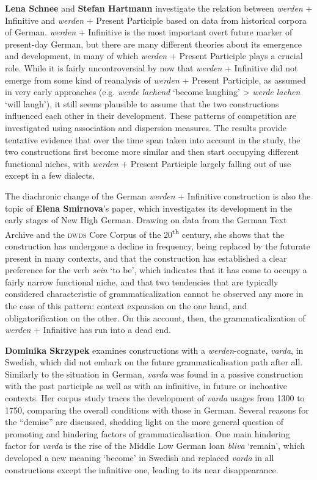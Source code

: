 \documentclass[output=paper,colorlinks,citecolor=brown]{langscibook}
\begin{document}
\textbf{Lena Schnee} and \textbf{Stefan Hartmann} investigate the relation between \textit{werden} + Infinitive and \textit{werden} + Present Participle based on data from historical corpora of German. \textit{werden} + Infinitive is the most important overt future marker of present-day German, but there are many different theories about its emergence and development, in many of which \textit{werden} + Present Participle plays a crucial role. While it is fairly uncontroversial by now that \textit{werden} + Infinitive did not emerge from some kind of reanalysis of \textit{werden} + Present Participle, as assumed in very early approaches (e.g. \textit{werde lachend} `become laughing' > \textit{werde lachen} `will laugh'), it still seems plausible to assume that the two constructions influenced each other in their development. These patterns of competition are investigated using association and dispersion measures. The results provide tentative evidence that over the time span taken into account in the study, the two constructions first become more similar and then start occupying different functional niches, with \textit{werden} + Present Participle largely falling out of use except in a few dialects.

The diachronic change of the German \textit{werden} + Infinitive construction is also the topic of \textbf{Elena Smirnova}'s paper, which investigates its development  in the early stages of New High German. Drawing on data from the German Text Archive and the \textsc{dwds} Core Corpus of the 20\textsuperscript{th} century, she shows that the construction has undergone a decline in frequency, being replaced by the futurate present in many contexts, and that the construction has established a clear preference for the verb \textit{sein} `to be', which indicates that it has come to occupy a fairly narrow functional niche, and that two tendencies that are typically considered characteristic of grammaticalization cannot be observed any more in the case of this pattern: context expansion \citep[][]{Himmelmann2004} on the one hand, and obligatorification \citep[][]{Lehmann2015} on the other. On this account, then, the grammaticalization of \textit{werden} + Infinitive has run into a dead end.

\textbf{Dominika Skrzypek} examines constructions with a \textit{werden}-cognate, \textit{varda}, in Swedish, which did not embark on the future grammaticalisation path after all. Similarly to the situation in German, \textit{varda} was found in a passive construction with the past participle as well as with an infinitive, in future or inchoative contexts. Her corpus study traces the development of \textit{varda} usages from 1300 to 1750, comparing the overall conditions with those in German. Several reasons for the “demise” are discussed, shedding light on the more general question of promoting and hindering factors of grammaticalisation. One main hindering factor for \textit{varda} is the rise of the Middle Low German loan \textit{bliva} ‘remain’, which developed a new meaning ‘become' in Swedish and replaced \textit{varda} in all constructions except the infinitive one, leading to its near disappearance. 
\end{document}
